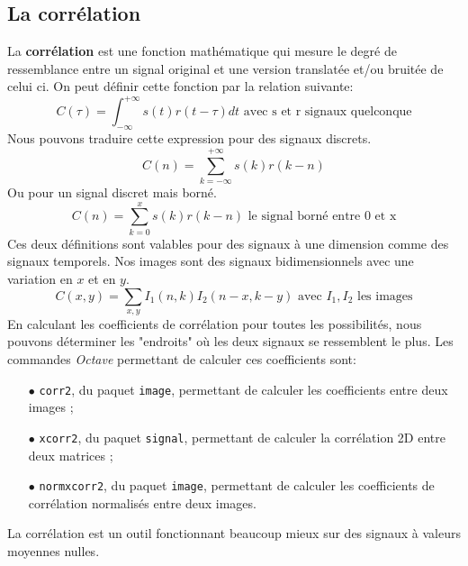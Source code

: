 \documentclass[a4paper,12pt,titlepage]{report}
\newcommand{\octave}{\textit{Octave }}
\begin{document}
		\subsection{La corrélation}
		La \textbf{corrélation} est une fonction mathématique qui mesure le degré de ressemblance entre un signal original et une version translatée et/ou bruitée de celui ci. On peut définir cette fonction par la relation suivante:
		\begin{equation}
			C(\tau)=\int_{-\infty}^{+\infty}s(t)r(t-\tau)dt \text{ avec s et r signaux quelconque}
		\end{equation}
		Nous pouvons traduire cette expression pour des signaux discrets.
		\begin{equation}
			C(n)=\sum_{k = -\infty}^{+\infty}s(k)r(k-n)	
		\end{equation}
		Ou pour un signal discret mais borné.
		\begin{equation}
			C(n)=\sum_{k = 0}^{x}s(k)r(k-n)	\text{ le signal borné entre 0 et x} 
		\end{equation}		
		Ces deux définitions sont valables pour des signaux à une dimension comme des signaux temporels. Nos images sont des signaux bidimensionnels avec une variation en $x$ et en $y$.
		\begin{equation}
			C(x,y)=\sum_{x,y} I_1(n,k)I_2(n-x,k-y) \text{ avec }I_1, I_2 \text{ les images}
		\end{equation}
		En calculant les coefficients de corrélation pour toutes les possibilités, nous pouvons déterminer les "endroits" où les deux signaux se ressemblent le plus.
		Les commandes \octave permettant de calculer ces coefficients sont:
		\begin{itemize}
		\item[$\bullet$] \texttt{corr2}, du paquet \texttt{image}, permettant de calculer les coefficients entre deux images ;
		\item[$\bullet$] \texttt{xcorr2}, du paquet \texttt{signal}, permettant de calculer la corrélation 2D entre deux matrices ;
		\item[$\bullet$] \texttt{normxcorr2}, du paquet \texttt{image}, permettant de calculer les coefficients de corrélation normalisés entre deux images. 
		\end{itemize}		
		La corrélation est un outil fonctionnant beaucoup mieux sur des signaux à valeurs moyennes nulles.
\end{document}
